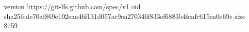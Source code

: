 version https://git-lfs.github.com/spec/v1
oid sha256:de70af869e102eaa46f131d057ac9ea270346f833ef6883b4fcafc615ea0e69e
size 8759
